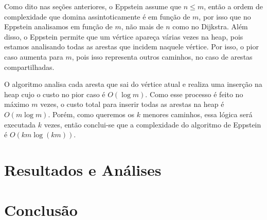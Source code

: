 \documentclass[12pt]{article}
\begin{document}
    Como dito nas seções anteriores, o Eppstein assume que $n \leq m$, então a ordem de complexidade que domina assintoticamente é em função de $m$, por isso que no Eppstein analisamos em função de $m$, não mais de $n$ como no Dijkstra. Além disso, o Eppstein permite que um vértice apareça várias vezes na heap, pois estamos analisando todas as arestas que incidem naquele vértice. Por isso, o pior caso aumenta para $m$, pois isso representa outros caminhos, no caso de arestas compartilhadas.
    
    O algoritmo analisa cada aresta que sai do vértice atual e realiza uma inserção na heap cujo o custo no pior caso é $O(\log m)$. Como esse processo é feito no máximo $m$ vezes, o custo total para inserir todas as arestas na heap é $O(m \log m)$. Porém, como queremos os $k$ menores caminhos, essa lógica será executada $k$ vezes, então conclui-se que a complexidade do algoritmo de Eppstein é $O(km \log (km))$.

    \section{Resultados e Análises}


    \section{Conclusão}
 
    

    \printbibliography[title={Whole bibliography}]
\end{document}
